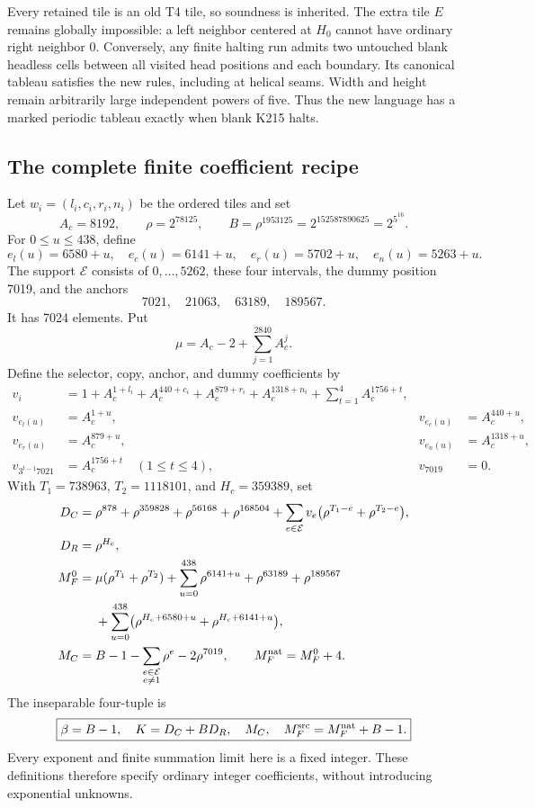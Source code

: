 Every retained tile is an old T4 tile, so soundness is inherited.  The
extra tile $E$ remains globally impossible: a left neighbor centered at
$H_0$ cannot have ordinary right neighbor 0.  Conversely, any finite
halting run admits two untouched blank headless cells between all visited
head positions and each boundary.  Its canonical tableau satisfies the
new rules, including at helical seams.  Width and height remain arbitrarily
large independent powers of five.  Thus the new language has a marked
periodic tableau exactly when blank K215 halts.

\subsection{The complete finite coefficient recipe}
Let $w_i=(l_i,c_i,r_i,n_i)$ be the ordered tiles and set
\[
A_c=8192,\qquad \rho=2^{78125},\qquad
B=\rho^{1953125}=2^{152587890625}=2^{5^{16}}.
\]
For $0\le u\le438$, define
\[
e_l(u)=6580+u,\quad e_c(u)=6141+u,\quad
e_r(u)=5702+u,\quad e_n(u)=5263+u.
\]
The support $\mathcal E$ consists of $0,\ldots,5262$, these four intervals,
the dummy position 7019, and the anchors
\[
7021,\quad21063,\quad63189,\quad189567.
\]
It has 7024 elements.  Put
\[
\mu=A_c-2+\sum_{j=1}^{2840}A_c^j.
\]
Define the selector, copy, anchor, and dummy coefficients by
\begin{align*}
v_i&=1+A_c^{1+l_i}+A_c^{440+c_i}+A_c^{879+r_i}
       +A_c^{1318+n_i}+\sum_{t=1}^{4}A_c^{1756+t},\\
v_{e_l(u)}&=A_c^{1+u},&v_{e_c(u)}&=A_c^{440+u},\\
v_{e_r(u)}&=A_c^{879+u},&v_{e_n(u)}&=A_c^{1318+u},\\
v_{3^{t-1}7021}&=A_c^{1756+t}\quad(1\le t\le4),&v_{7019}&=0.
\end{align*}
With $T_1=738963$, $T_2=1118101$, and $H_c=359389$, set
\begin{align*}
D_C={}&\rho^{878}+\rho^{359828}+\rho^{56168}+\rho^{168504}
 +\sum_{e\in\mathcal E}v_e
       \bigl(\rho^{T_1-e}+\rho^{T_2-e}\bigr),\\
D_R={}&\rho^{H_c},\\
M_F^0={}&\mu(\rho^{T_1}+\rho^{T_2})+
       \sum_{u=0}^{438}\rho^{6141+u}+\rho^{63189}+\rho^{189567}\\
 &+\sum_{u=0}^{438}
       \bigl(\rho^{H_c+6580+u}+\rho^{H_c+6141+u}\bigr),\\
M_C={}&B-1-\sum_{\substack{e\in\mathcal E\\e\ne1}}\rho^e
              -2\rho^{7019},\qquad
M_F^{\rm nat}=M_F^0+4.
\end{align*}
The inseparable four-tuple is
\[
\boxed{\beta=B-1,\quad K=D_C+BD_R,\quad M_C,\quad
M_F^{\rm src}=M_F^{\rm nat}+B-1.}
\]
Every exponent and finite summation limit here is a fixed integer.  These
definitions therefore specify ordinary integer coefficients, without
introducing exponential unknowns.

